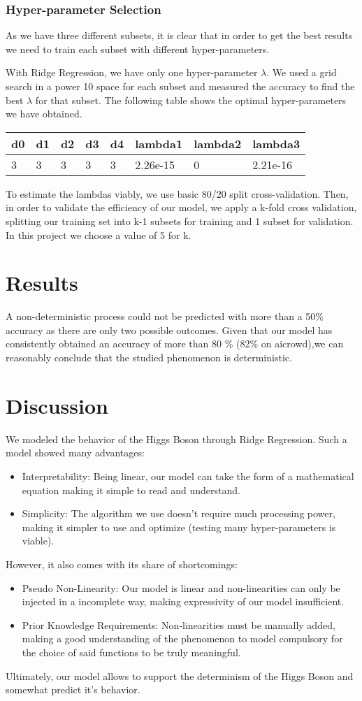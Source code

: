 \documentclass[10pt,conference,compsocconf]{IEEEtran}
\begin{document}
\subsubsection{Hyper-parameter Selection}
 As we have three different subsets, it is clear that in order to get the best results we need to train each subset with different hyper-parameters.
 
 With Ridge Regression, we have only one hyper-parameter $\lambda $. We used a grid search in a power 10 space for each subset and measured the accuracy to find the best $\lambda $ for that subset.
 The following table shows the optimal hyper-parameters we have obtained.
 \vspace{3mm}

\begin{tabular}[c]{|l||l|l|l|l|l|l|l|}
\hline
d0&d1&d2&d3&d4&lambda1&lambda2&lambda3\\
\hline
3&3&3&3&3&2.26e-15&0&2.21e-16
\end{tabular}
\vspace{3mm}

To estimate the lambdas viably, we use basic 80/20 split cross-validation.  
Then, in order to validate the efficiency of our model, we apply a k-fold cross validation, splitting our training set into k-1 subsets for training and 1 subset for validation. In this project we choose a value of 5 for k.
\section{Results}
A non-deterministic process could not be predicted with more than a 50\% accuracy as there are only two possible outcomes.
Given that our model has consistently obtained an accuracy of more than 80 \% (82\% on aicrowd),we can reasonably conclude that the studied phenomenon is deterministic.
\section{Discussion}
We modeled the behavior of the Higgs Boson through Ridge Regression. Such a model showed many advantages:
\begin{itemize}
\item Interpretability: Being linear, our model can take the form of a mathematical equation making it simple to read and understand. 
\item Simplicity: The algorithm we use doesn't require much processing power, making it simpler to use and optimize (testing many hyper-parameters is viable).
\end{itemize}
However, it also comes with its share of shortcomings:
\begin{itemize}
\item Pseudo Non-Linearity: Our model is linear and non-linearities can only be injected in a incomplete way, making expressivity of our model insufficient. 
\item Prior Knowledge Requirements: Non-linearities must be manually added, making a good understanding of the phenomenon to model compulsory for the choice of said functions to be truly meaningful.
\end{itemize}
Ultimately, our model allows to support the determinism of the Higgs Boson and somewhat predict it's behavior. 
\end{document}
